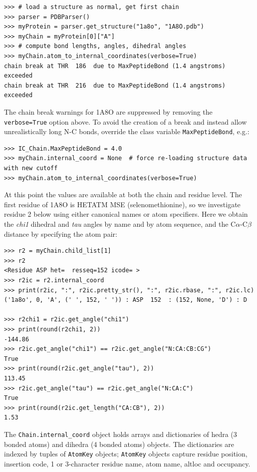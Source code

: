\begin{verbatim}
>>> # load a structure as normal, get first chain
>>> parser = PDBParser()
>>> myProtein = parser.get_structure("1a8o", "1A8O.pdb")
>>> myChain = myProtein[0]["A"]
>>> # compute bond lengths, angles, dihedral angles
>>> myChain.atom_to_internal_coordinates(verbose=True)
chain break at THR  186  due to MaxPeptideBond (1.4 angstroms) exceeded
chain break at THR  216  due to MaxPeptideBond (1.4 angstroms) exceeded
\end{verbatim}

The chain break warnings for 1A8O are suppressed by removing the \texttt{verbose=True}
option above. To avoid the creation of a break and instead allow unrealistically long
N-C bonds, override the class variable \texttt{MaxPeptideBond}, e.g.:

\begin{verbatim}
>>> IC_Chain.MaxPeptideBond = 4.0
>>> myChain.internal_coord = None  # force re-loading structure data with new cutoff
>>> myChain.atom_to_internal_coordinates(verbose=True)
\end{verbatim}

At this point the values are available at both the chain and residue level.  The
first residue of 1A8O is HETATM MSE (selenomethionine), so we investigate residue 2
below using either canonical names or atom specifiers.  Here we obtain the \textit{chi1}
dihedral and \textit{tau} angles by name and by atom sequence, and the C$\alpha$-C$\beta$
distance by specifying the atom pair:

\begin{verbatim}
>>> r2 = myChain.child_list[1]
>>> r2
<Residue ASP het=  resseq=152 icode= >
>>> r2ic = r2.internal_coord
>>> print(r2ic, ":", r2ic.pretty_str(), ":", r2ic.rbase, ":", r2ic.lc)
('1a8o', 0, 'A', (' ', 152, ' ')) : ASP  152  : (152, None, 'D') : D

>>> r2chi1 = r2ic.get_angle("chi1")
>>> print(round(r2chi1, 2))
-144.86
>>> r2ic.get_angle("chi1") == r2ic.get_angle("N:CA:CB:CG")
True
>>> print(round(r2ic.get_angle("tau"), 2))
113.45
>>> r2ic.get_angle("tau") == r2ic.get_angle("N:CA:C")
True
>>> print(round(r2ic.get_length("CA:CB"), 2))
1.53
\end{verbatim}

The \texttt{Chain.internal\_coord} object holds arrays and dictionaries of hedra (3
bonded atoms) and dihedra (4 bonded atoms) objects.  The dictionaries are indexed 
by tuples of \texttt{AtomKey} objects; \texttt{AtomKey} objects capture residue position, insertion
code, 1 or 3-character residue name, atom name, altloc and occupancy.  


